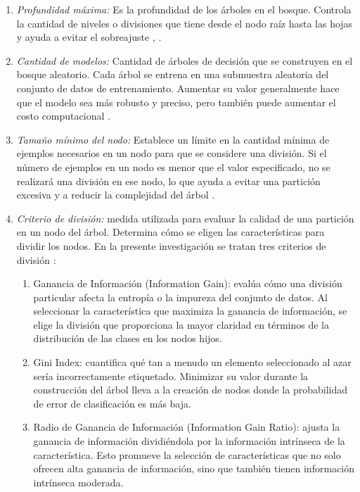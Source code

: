 	\begin{enumerate}
	\item \textit{Profundidad máxima:} Es la profundidad de los árboles en el bosque. Controla la cantidad de niveles o divisiones que tiene desde el nodo raíz hasta las hojas y ayuda a evitar el sobreajuste \citep{lakshmanan2021practical}, \citep{hastie2009elements}.
	\item \textit{Cantidad de modelos:} Cantidad de árboles de decisión que se construyen en el bosque aleatorio. Cada árbol se entrena en una submuestra aleatoria del conjunto de datos de entrenamiento. Aumentar su valor generalmente hace que el modelo sea más robusto y preciso, pero también puede aumentar el costo computacional \citep{lakshmanan2021practical}.
	\item \textit{Tamaño mínimo del nodo:} Establece un límite en la cantidad mínima de ejemplos necesarios en un nodo para que se considere una división. Si el número de ejemplos en un nodo es menor que el valor especificado, no se realizará una división en ese nodo, lo que ayuda a evitar una partición excesiva y a reducir la complejidad del árbol \citep{lakshmanan2021practical}.
	\item \textit{Criterio de división:} medida utilizada para evaluar la calidad de una partición en un nodo del árbol. Determina cómo se eligen las características para dividir los nodos. En la presente investigación se tratan tres criterios de división \citep{gupta2017analysis}:
	\begin{enumerate}
		\item Ganancia de Información (Information Gain): evalúa cómo una división particular afecta la entropía o la impureza del conjunto de datos. Al seleccionar la característica que maximiza la ganancia de información, se elige la división que proporciona la mayor claridad en términos de la distribución de las clases en los nodos hijos. 
		\item Gini Index: cuantifica qué tan a menudo un elemento seleccionado al azar sería incorrectamente etiquetado. Minimizar su valor durante la construcción del árbol lleva a la creación de nodos donde la probabilidad de error de clasificación es más baja. 
		\item Radio de Ganancia de Información (Information Gain Ratio): ajusta la ganancia de información dividiéndola por la información intrínseca de la característica. Esto promueve la selección de características que no solo ofrecen alta ganancia de información, sino que también tienen información intrínseca moderada. 
	\end{enumerate}
\end{enumerate}

